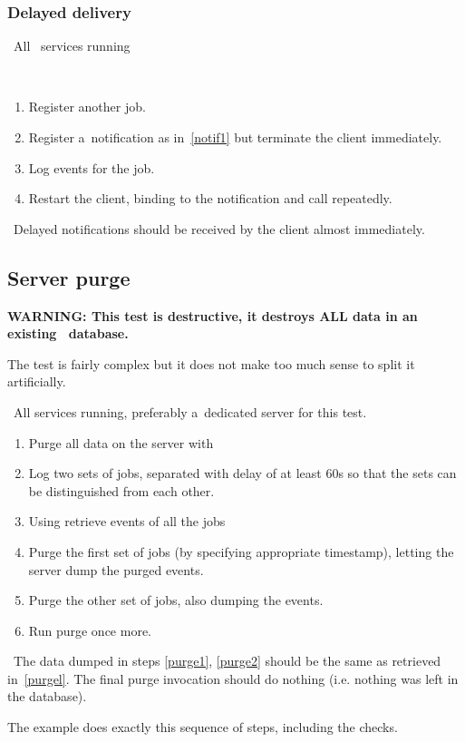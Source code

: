 
\subsubsection{Delayed delivery}

\req\ All \LB\ services running

\how\ 
\begin{enumerate}
\item Register another job.
\item Register a~notification as in~\ref{notif1} but terminate the client
immediately.
\item Log events for the job.
\item Restart the client, binding to the notification and call
 repeatedly.
\end{enumerate}

\result\ Delayed notifications should be received by the client almost
immediately.



\subsection{Server purge}

\textbf{WARNING: This test is destructive, it destroys ALL data in an
existing \LB\ database.} 

The test is fairly complex but it does not make too much sense to split it
artificially.

\req\ All \LB services running, preferably a~dedicated server for this test.

\how
\begin{enumerate}
\item Purge all data on the server with 
\item Log two sets of jobs, separated with delay of at least 60s so
that the sets can be distinguished from each other.
\item \label{purgel}
Using  retrieve events of all the jobs
\item \label{purge1}
Purge the first set of jobs (by specifying appropriate timestamp),
letting the server dump the purged events.
\item \label{purge2} Purge the other set of jobs, also dumping the events.
\item \label{purge3} Run purge once more.
\end{enumerate}

\result\ The data dumped in steps \ref{purge1}, \ref{purge2} should be the
same as retrieved in~\ref{purgel}. The final purge invocation should
do nothing (i.e. nothing was left in the database).

\begin{hints}
The example  does exactly this sequence of steps,
including the checks.
\end{hints}
